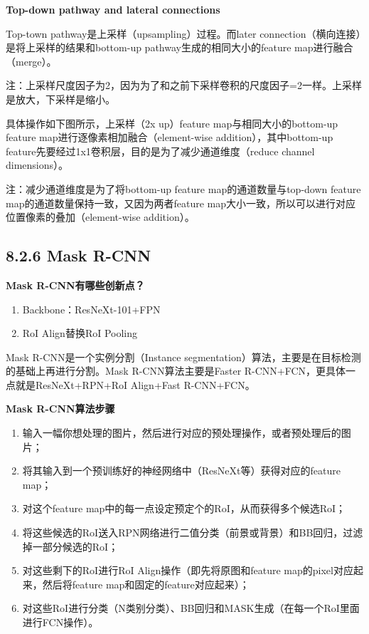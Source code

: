 \textbf{Top-down pathway and lateral connections}

Top-town pathway是上采样（upsampling）过程。而later
connection（横向连接）是将上采样的结果和bottom-up
pathway生成的相同大小的feature map进行融合（merge）。

注：上采样尺度因子为2，因为为了和之前下采样卷积的尺度因子=2一样。上采样是放大，下采样是缩小。

具体操作如下图所示，上采样（2x up）feature map与相同大小的bottom-up
feature map进行逐像素相加融合（element-wise addition），其中bottom-up
feature先要经过1x1卷积层，目的是为了减少通道维度（reduce channel
dimensions）。

注：减少通道维度是为了将bottom-up feature map的通道数量与top-down
feature map的通道数量保持一致，又因为两者feature
map大小一致，所以可以进行对应位置像素的叠加（element-wise addition）。

\begin{figure}
\centering
\caption{}
\end{figure}

\subsection{8.2.6 Mask R-CNN}\label{mask-r-cnn}

\textbf{Mask R-CNN有哪些创新点？}

\begin{enumerate}
\def\labelenumi{\arabic{enumi}.}
\item
  Backbone：ResNeXt-101+FPN
\item
  RoI Align替换RoI Pooling
\end{enumerate}

Mask R-CNN是一个实例分割（Instance
segmentation）算法，主要是在目标检测的基础上再进行分割。Mask
R-CNN算法主要是Faster R-CNN+FCN，更具体一点就是ResNeXt+RPN+RoI
Align+Fast R-CNN+FCN。

\begin{figure}
\centering
\caption{}
\end{figure}

\textbf{Mask R-CNN算法步骤}

\begin{enumerate}
\def\labelenumi{\arabic{enumi}.}
\item
  输入一幅你想处理的图片，然后进行对应的预处理操作，或者预处理后的图片；
\item
  将其输入到一个预训练好的神经网络中（ResNeXt等）获得对应的feature map；
\item
  对这个feature map中的每一点设定预定个的RoI，从而获得多个候选RoI；
\item
  将这些候选的RoI送入RPN网络进行二值分类（前景或背景）和BB回归，过滤掉一部分候选的RoI；
\item
  对这些剩下的RoI进行RoI Align操作（即先将原图和feature
  map的pixel对应起来，然后将feature map和固定的feature对应起来）；
\item
  对这些RoI进行分类（N类别分类）、BB回归和MASK生成（在每一个RoI里面进行FCN操作）。
\end{enumerate}

